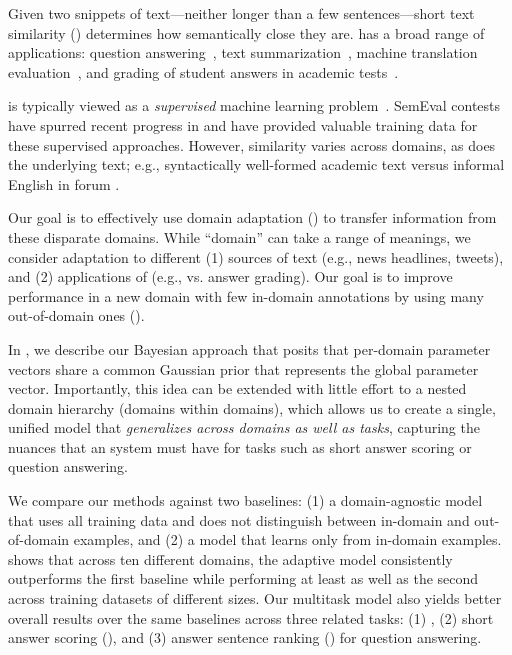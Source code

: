 


Given two snippets of text---neither longer than a few
sentences---short text similarity (\textbf{\sts{}}) determines how
semantically close they are.  \sts{} has a broad range of
applications: question answering~\cite{Yao:2013,Severyn:2015}, text
summarization~\cite{Dasgupta:2013,Wang:2013}, machine translation
evaluation~\cite{Chan:2008,Liu:2011}, and grading of student answers
in academic tests~\cite{Mohler:2011,Ramachandran:2015}.

\sts{} is typically viewed as a \emph{supervised} machine learning
problem~\cite{Bar:2012,Lynum:2014,Hanig:2015}.  SemEval
 contests~\cite{Agirre:2012,Agirre:2015} have spurred recent progress
 in \sts{} and have provided valuable training data for these
 supervised approaches.  However, similarity varies across domains, as
 does the underlying text; e.g., syntactically well-formed academic
 text versus informal English in forum \qa{}.




Our goal is to effectively use domain adaptation (\da{}) to transfer
information from these disparate \sts{} domains.  While ``domain'' can
take a range of meanings, we consider adaptation to different (1)
sources of text (e.g., news headlines, tweets), and (2) applications
of \sts{} (e.g., \qa{} vs. answer grading).  Our goal is to improve
performance in a new domain with few in-domain annotations by using
many out-of-domain ones ().

In , we describe our Bayesian approach that
posits that per-domain parameter vectors share a common Gaussian prior that represents
the global parameter vector.  Importantly, this idea can be extended with little
effort to a nested domain hierarchy (domains within domains), which
allows us to create a single, unified \sts{} model that \emph{generalizes across
domains as well as tasks}, capturing the nuances that an \sts{} system must have
for tasks such as short answer scoring or question answering.

We compare our \da{} methods against two baselines: (1) a domain-agnostic model
that uses all training data and does not distinguish between in-domain
and out-of-domain examples, and (2) a model that learns only from in-domain
examples.   shows that across ten different \sts{}
domains, the adaptive model consistently outperforms the first baseline while
performing at least as well as the second across training datasets of different
sizes.  Our multitask model also yields better overall results over the same
baselines across three related tasks: (1) \sts{}, (2) short answer scoring
(\sas{}), and (3) answer sentence ranking (\asr{}) for question answering.  
